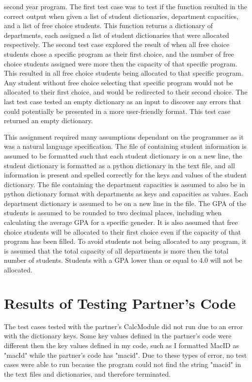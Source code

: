 \documentclass[12pt]{article}
\begin{document}
second year program. The first test case was to test if the function resulted in the correct output when given a list 
of student dictionaries, department capacities, and a list of free choice students. This function returns a dictionary 
of departments, each assigned a list of student dictionaries that were allocated respectively. The second test case explored 
the result of when all free choice students chose a specific program as their first choice, and the number of free choice 
students assigned were more then the capacity of that specific program. This resulted in all free choice students being allocated 
to that specific program. Any student without free choice selecting that specific program would not be allocated to their first 
choice, and would be redirected to their second choice. The last test case tested an empty dictionary as an input to discover 
any errors that could potentially be presented in a more user-friendly format. This test case returned an empty dictionary.

This assignment required many assumptions dependant on the programmer as it was a natural language specification. The file of containing 
student information is assumed to be formatted such that each student dictionary is on a new line, the student dictionary is formatted as 
a python dictionary in the text file, and all information is present and spelled correctly for the keys and values of the student dictionary. 
The file containing the department capacities is assumed to also be in python dictionary format with departments as keys and capacities as values. 
Each department dictionary is assumed to be on a new line in the file. The GPA of the students is assumed to be rounded to two decimal places, 
including when calculating the average GPA for a specific geneder. It is also assumed that free choice students will be allocated to their first 
choice even if the capacity of that program has been filled. To avoid students not being allocated to any program, it is assumed that the total 
capacity of all departments is more then the total number of students. Students with a GPA lower than or equal to 4.0 will not be allocated.

\section{Results of Testing Partner's Code}

The test cases tested with the partner's CalcModule did not run due to an error with the dictionary keys. Some key values defined in the partner's code were different
then the key values defined in my code, such as I formatted MacID as "macId" while the partner's code has "macid". Due to these types of error, no test 
cases were able to run because the program could not find the string "macid" in the text files and dictionaries, and therefore terminated.
\end{document}

